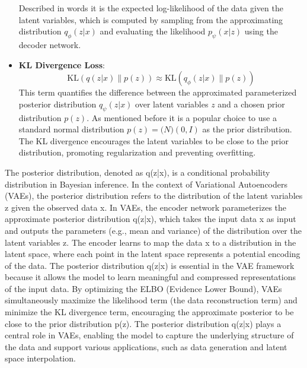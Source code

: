 \begin{itemize}
	Described in words it is the expected log-likelihood of the data given the latent variables, which is computed by sampling from the approximating distribution $q_\phi(z|x)$ and evaluating the likelihood $p_\psi(x|z)$ using the decoder network.
	\item \textbf{KL Divergence Loss}: 
	\begin{equation}
		\text{KL}\left( q(z|x) \| p(z) \right) \approx \text{KL}\left( q_\phi(z|x) \| p(z) \right)
	\end{equation}
	This term quantifies the difference between the approximated parameterized posterior distribution $q_\psi(z|x) $ over latent variables $z$ and a chosen prior distribution $p(z)$. As mentioned before it is a popular choice to use a standard normal distribution $p(z)=\mathcal(N)(0,I)$ as the prior distribution. The KL divergence encourages the latent variables to be close to the prior distribution, promoting regularization and preventing overfitting.
\end{itemize}

\iffalse
The posterior distribution, denoted as q(z|x), is a conditional probability distribution in Bayesian inference. In the context of Variational Autoencoders (VAEs), the posterior distribution refers to the distribution of the latent variables z given the observed data x.
In VAEs, the encoder network parameterizes the approximate posterior distribution q(z|x), which takes the input data x as input and outputs the parameters (e.g., mean and variance) of the distribution over the latent variables z. The encoder learns to map the data x to a distribution in the latent space, where each point in the latent space represents a potential encoding of the data.
The posterior distribution q(z|x) is essential in the VAE framework because it allows the model to learn meaningful and compressed representations of the input data. By optimizing the ELBO (Evidence Lower Bound), VAEs simultaneously maximize the likelihood term (the data reconstruction term) and minimize the KL divergence term, encouraging the approximate posterior to be close to the prior distribution p(z).
The posterior distribution q(z|x) plays a central role in VAEs, enabling the model to capture the underlying structure of the data and support various applications, such as data generation and latent space interpolation.

